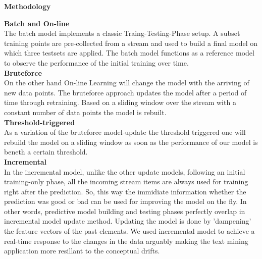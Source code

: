 \begin{center} \textbf{\huge Methodology} \end{center}
\textbf{\large Batch and On-line}\\
The batch model implements a classic Traing-Testing-Phase setup. A subset training points are pre-collected from a stream and used to build a final model on  which three testsets are applied. The batch model functions as a reference model to observe the performance of the initial training over time. \\
\textbf{\large Bruteforce}\\
On the other hand On-line Learning will change the model with the arriving of new data points.
The bruteforce approach updates the model after a period of time through retraining. Based on a sliding window over the stream with a constant number of data points 
the model is rebuilt.\\
\textbf{\large Threshold-triggered}\\
As a variation of the bruteforce model-update the threshold triggered one will rebuild the model on a sliding window as soon as the performance of our model is beneth a certain threshold. \\
\textbf{\large Incremental}\\
In the incremental model, unlike the other update models, following an initial training-only phase, all the incoming stream items are always used for training right after the prediction. So, this way the immidiate information whether the prediction was good or bad can be used for improving the model on the fly. In other words, predictive model building and testing phases perfectly overlap in incremental model update method. Updating the model is done by 'dampening' the feature vectors of the past elements. We used incremental model to achieve a real-time response to the changes in the data arguably making the text mining application more resillant to the conceptual drifts.
